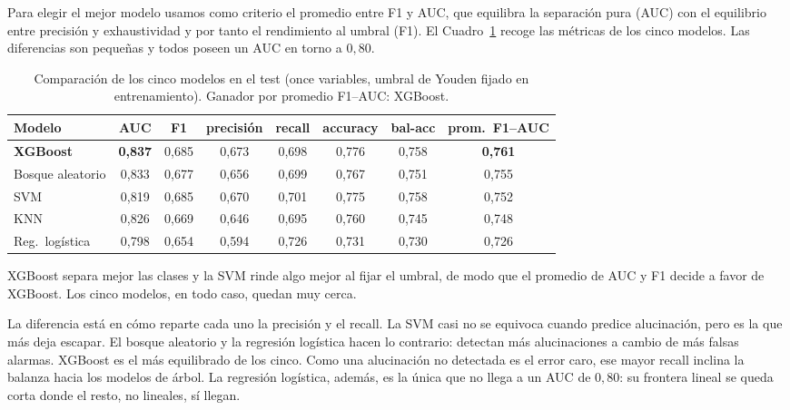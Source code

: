 \documentclass[12pt,a4paper]{report}
\theoremstyle{definition}
\begin{document}
Para elegir el mejor modelo usamos como criterio el promedio entre F1 y AUC, que equilibra
la separación pura (AUC) con el equilibrio entre precisión y exhaustividad y por tanto el rendimiento al umbral (F1). El Cuadro~\ref{tab:modelos}
recoge las métricas de los cinco modelos. Las diferencias son pequeñas y todos poseen un AUC en torno a $0{,}80$.

\begin{table}[H]
\centering
\small
\begin{tabular}{lccccccc}
\toprule
Modelo & AUC & F1 & precisión & recall & accuracy & bal-acc & prom.\ F1--AUC \\
\midrule
\textbf{XGBoost} & \textbf{0,837} & 0,685 & 0,673 & 0,698 & 0,776 & 0,758 & \textbf{0,761} \\
Bosque aleatorio & 0,833 & 0,677 & 0,656 & 0,699 & 0,767 & 0,751 & 0,755 \\
SVM & 0,819 & 0,685 & 0,670 & 0,701 & 0,775 & 0,758 & 0,752 \\
KNN & 0,826 & 0,669 & 0,646 & 0,695 & 0,760 & 0,745 & 0,748 \\
Reg.\ logística & 0,798 & 0,654 & 0,594 & 0,726 & 0,731 & 0,730 & 0,726 \\
\bottomrule
\end{tabular}
\caption{Comparación de los cinco modelos en el test (once variables, umbral de
Youden fijado en entrenamiento). Ganador por promedio F1--AUC: XGBoost.}
\label{tab:modelos}
\end{table}

XGBoost separa mejor las clases y la SVM rinde algo mejor al fijar el umbral, de modo que el
promedio de AUC y F1 decide a favor de XGBoost. Los cinco modelos, en todo caso, quedan muy cerca.

La diferencia está en cómo reparte cada uno la precisión y el recall. La SVM casi no se equivoca
cuando predice alucinación, pero es la que más deja escapar. El bosque aleatorio y la regresión
logística hacen lo contrario: detectan más alucinaciones a cambio de más falsas alarmas. XGBoost
es el más equilibrado de los cinco. Como una alucinación no detectada es el error caro, ese mayor
recall inclina la balanza hacia los modelos de árbol. La regresión logística, además, es la única
que no llega a un AUC de $0{,}80$: su frontera lineal se queda corta donde el resto, no lineales,
sí llegan.
\end{document}
